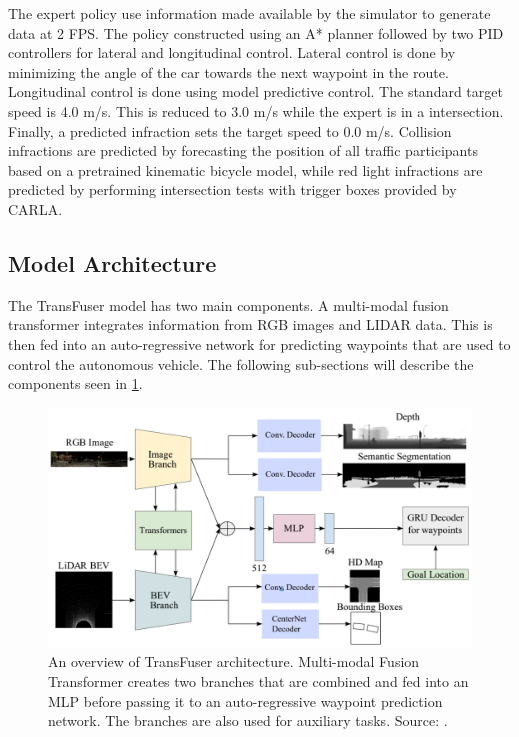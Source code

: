 The expert policy use information made available by the simulator to generate data at 2 FPS. The policy constructed using an A* planner followed by two PID controllers for lateral and longitudinal control. Lateral control is done by minimizing the angle of the car towards the next waypoint in the route. Longitudinal control is done using model predictive control. The standard target speed is 4.0 m/s. This is reduced to 3.0 m/s while the expert is in a intersection. Finally, a predicted infraction sets the target speed to 0.0 m/s. Collision infractions are predicted by forecasting the position of all traffic participants based on a pretrained kinematic bicycle model, while red light infractions are predicted by performing intersection tests with trigger boxes provided by CARLA.

\subsection{Model Architecture}
The TransFuser model has two main components. A multi-modal fusion transformer integrates information from RGB images and LIDAR data. This is then fed into an auto-regressive network for predicting waypoints that are used to control the autonomous vehicle. The following sub-sections will describe the components seen in \cref{fig:alt-transfuser-architecture}.

\begin{figure}
    \centering
    \includegraphics[width=\textwidth]{chapters/3-method/figures/transfuser.png}
    \caption{An overview of TransFuser architecture. Multi-modal Fusion Transformer creates two branches that are combined and fed into an MLP before passing it to an auto-regressive waypoint prediction network. The branches are also used for auxiliary tasks. Source: \cite{transfuser-pami}.}
    \label{fig:alt-transfuser-architecture}
\end{figure}

